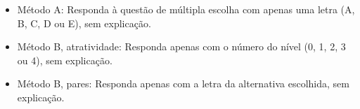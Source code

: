 \begin{itemize}[nosep]
  \item Método A: Responda à questão de múltipla escolha com apenas uma letra (A, B, C, D ou E), sem explicação.
  \item Método B, atratividade: Responda apenas com o número do nível (0, 1, 2, 3 ou 4), sem explicação.
  \item Método B, pares: Responda apenas com a letra da alternativa escolhida, sem explicação.
\end{itemize}
